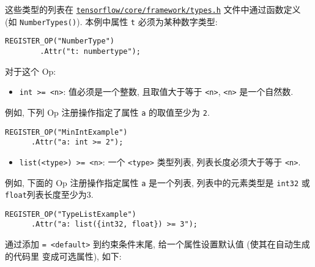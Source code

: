 这些类型的列表在
\href{https://tensorflow.googlesource.com/tensorflow/+/master/tensorflow/core/framework/types.h}{\texttt{tensorflow/core/framework/types.h}}
文件中通过函数定义 (如 \texttt{NumberTypes()}). 本例中属性 \texttt{t}
必须为某种数字类型:

\begin{verbatim}
REGISTER_OP("NumberType")
        .Attr("t: numbertype");
\end{verbatim}

对于这个 Op:

\begin{Shaded}
\begin{Highlighting}[]
\OperatorTok{=}
\OperatorTok{=}\NormalTok{)   }
\end{Highlighting}
\end{Shaded}

\begin{itemize}
\tightlist
\item
  \texttt{int\ \textgreater{}=\ \textless{}n\textgreater{}}:
  值必须是一个整数, 且取值大于等于 \texttt{\textless{}n\textgreater{}},
  \texttt{\textless{}n\textgreater{}} 是一个自然数.
\end{itemize}

例如, 下列 Op 注册操作指定了属性 \texttt{a} 的取值至少为 \texttt{2}.

\begin{verbatim}
REGISTER_OP("MinIntExample")
      .Attr("a: int >= 2");
\end{verbatim}

\begin{itemize}
\tightlist
\item
  \texttt{list(\textless{}type\textgreater{})\ \textgreater{}=\ \textless{}n\textgreater{}}:
  一个 \texttt{\textless{}type\textgreater{}} 类型列表,
  列表长度必须大于等于 \texttt{\textless{}n\textgreater{}}.
\end{itemize}

例如, 下面的 Op 注册操作指定属性 \texttt{a} 是一个列表,
列表中的元素类型是 \texttt{int32} 或 \texttt{float}列表长度至少为3.

\begin{verbatim}
REGISTER_OP("TypeListExample")
      .Attr("a: list({int32, float}) >= 3");
\end{verbatim}

通过添加 \texttt{=\ \textless{}default\textgreater{}} 到约束条件末尾,
给一个属性设置默认值 (使其在自动生成的代码里 变成可选属性), 如下:

